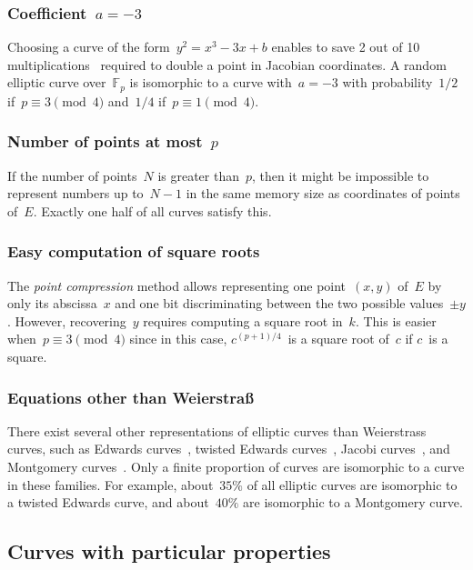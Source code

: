 \documentclass{article}
\def\F{\mathbb{F}}
\begin{document}
\subsubsection{Coefficient~$a = -3$}

Choosing a curve of the form~$y^2 = x^3 - 3 x + b$
enables to save 2 out of 10 multiplications~\cite{ieeep1363}
required to double a point in Jacobian coordinates.
A random elliptic curve over~$\F_p$
is isomorphic to a curve with~$a = -3$
with probability~$1/2$ if~$p ≡ 3 \pmod{4}$ and~$1/4$ if~$p ≡ 1 \pmod{4}$.

\subsubsection{Number of points at most~$p$}

If the number of points~$N$ is greater than~$p$,
then it might be impossible to represent numbers up to~$N-1$
in the same memory size as coordinates of points of~$E$.
Exactly one half of all curves satisfy this.

\subsubsection{Easy computation of square roots}

The \emph{point compression} method allows representing
one point~$(x,y)$ of~$E$ by only its abscissa~$x$ and
one bit discriminating between the two possible values~$±y$.
However, recovering~$y$ requires computing a square root in~$k$.
This is easier when~$p ≡ 3 \pmod{4}$ since
in this case, $c^{(p+1)/4}$~is a square root of~$c$ if $c$~is a square.

\subsubsection{Equations other than Weierstraß}

There exist several other representations of elliptic curves
than Weierstrass curves, such as
Edwards curves~\cite{ams2007edwards},
twisted Edwards curves~\cite{africa2008bbjl},
Jacobi curves~\cite{aaaaec2003bj},
and Montgomery curves~\cite{mathcomp1987montgomery}.
Only a finite proportion of curves are isomorphic
to a curve in these families.
For example, about~$35\%$ of all elliptic curves
are isomorphic to a twisted Edwards curve,
and about~$40\%$ are isomorphic to a Montgomery curve.

\subsection{Curves with particular properties}
\end{document}
